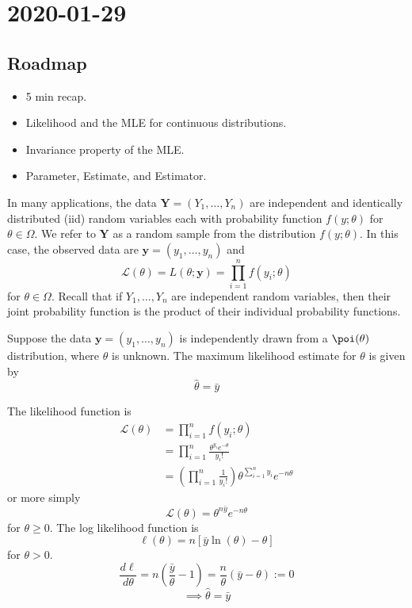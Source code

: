 \section{2020-01-29}
\subsection*{Roadmap}
\begin{itemize}
    \item 5 min recap.
    \item Likelihood and the MLE for continuous distributions.
    \item Invariance property of the MLE\@.
    \item Parameter, Estimate, and Estimator.
\end{itemize}

\begin{Definition}{}{}
    In many applications, the data $ \symbf{Y}=(Y_1,\ldots ,Y_n) $ are independent
    and identically distributed (iid) random variables each with probability function
    $ f(y;\theta) $ for $ \theta\in\Omega $. We refer to $ \symbf{Y} $
    as a random sample from the distribution $ f(y;\theta) $. In this case,
    the observed data are $ \symbf{y}=(y_1,\ldots ,y_n) $ and
    \[ \mathcal{L}(\theta)=L(\theta;\symbf{y})=\prod_{i=1}^n f(y_i;\theta) \]
    for $ \theta\in\Omega $. Recall that if $ Y_1,\ldots ,Y_n $ are
    independent random variables, then their joint probability function is
    the product of their individual probability functions.
\end{Definition}



\begin{Proposition}{}{}
    Suppose the data $ \symbf{y}=(y_1,\ldots ,y_n) $ is independently
    drawn from a $ \poi(\theta) $ distribution, where $ \theta $ is unknown.
    The maximum likelihood estimate for $ \theta $ is given by
    \[ \hat{\theta}=\bar{y} \]
\end{Proposition}

\begin{Proof}{}{}
    The likelihood function is
    \begin{align*}
        \mathcal{L}(\theta) & =
        \prod_{i=1}^n f(y_i;\theta)                                               \\
                            & =\prod_{i=1}^n \frac{\theta^{y_i}e^{-\theta}}{y_i!} \\
                            & =\left( \prod_{i=1}^n  \frac{1}{y_i!} \right)
        \theta^{\sum\limits_{i=1}^{n} y_i}e^{-n\theta}
    \end{align*}
    or more simply
    \[ \mathcal{L}(\theta)=\theta^{n\bar{y}}e^{-n\theta} \]
    for $ \theta\geqslant 0 $. The log likelihood function is
    \[ \ell(\theta)=n\left[ \bar{y}\ln(\theta)-\theta \right] \]
    for $ \theta>0 $.
    \[ \frac{d\ell}{d\theta} =n\left( \frac{\bar{y}}{\theta}-1 \right)=\frac{n}{\theta}
        \left( \bar{y}-\theta \right):=0 \]
    \[ \implies \hat{\theta}=\bar{y} \]
\end{Proof}


